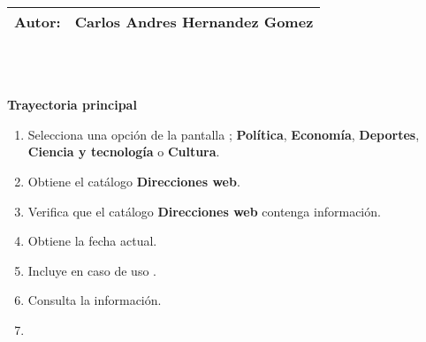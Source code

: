 \begin{tabular}{|l|l|}
	\textbf{Autor:} & Carlos Andres Hernandez Gomez \\
	\hline
\end{tabular}\\\\




\begin{large}
	\textbf{Trayectoria principal}\\
\end{large}	

\begin{enumerate}[1.]
	
	\item \actor Selecciona una opción de la pantalla ; \textbf{Política}, \textbf{Economía}, \textbf{Deportes}, \textbf{Ciencia y tecnología} o \textbf{Cultura}. 
	
	\item \sistema Obtiene el catálogo \textbf{Direcciones web}.
	
	\item \sistema Verifica que el catálogo \textbf{Direcciones web} contenga información. 

	\item \sistema Obtiene la fecha actual.

	\item \sistema Incluye en caso de uso .

	\item \actor Consulta la información.
	
	\item \finCU	

\end{enumerate}




